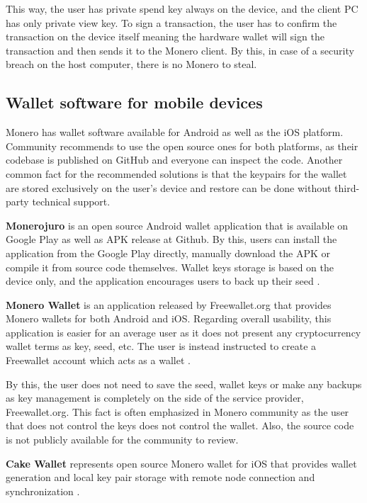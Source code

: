 \documentclass[
  printed, %
  table,   %
  lof,     %
  lot,     %
           oneside, color
]{fithesis3}
\begin{document}
This way, the user has private spend key always on the device, and the client PC has only private view key. To sign a transaction, the user has to confirm the transaction on the device itself meaning the hardware wallet will sign the transaction and then sends it to the Monero client. By this, in case of a security breach on the host computer, there is no Monero to steal.

\subsection{Wallet software for mobile devices}

Monero has wallet software available for Android as well as the iOS platform. Community recommends to use the open source ones for both platforms, as their codebase is published on GitHub and everyone can inspect the code. Another common fact for the recommended solutions is that the keypairs for the wallet are stored exclusively on the user's device and restore can be done without third-party technical support.

\textbf{Monerojuro} is an open source Android wallet application that is available on Google Play as well as APK release at Github. By this, users can install the application from the Google Play directly, manually download the APK or compile it from source code themselves. Wallet keys storage is based on the device only, and the application encourages users to back up their seed \cite{xmrwalletgithub}.

\textbf{Monero Wallet} is an application released by Freewallet.org that provides Monero wallets for both Android and iOS. Regarding overall usability, this application is easier for an average user as it does not present any cryptocurrency wallet terms as key, seed, etc. The user is instead instructed to create a Freewallet account which acts as a wallet \cite{freewallet}. 

By this, the user does not need to save the seed, wallet keys or make any backups as key management is completely on the side of the service provider, Freewallet.org. This fact is often emphasized in Monero community as the user that does not control the keys does not control the wallet. Also, the source code is not publicly available for the community to review.

\textbf{Cake Wallet} represents open source Monero wallet for iOS that provides wallet generation and local key pair storage with remote node connection and synchronization \cite{cakewalletgithub}.
\end{document}
